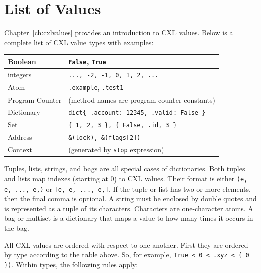 \documentclass{report}
\begin{document}



\appendix

\chapter{List of Values}

Chapter~\ref{ch:cxlvalues} provides an introduction to CXL values.
Below is a complete list of CXL value types with examples:

\vspace{1em}
\begin{tabular}{|l|l|}
\hline
Boolean & \texttt{False}, \texttt{True} \\
\hline
integers & \texttt{..., -2, -1, 0, 1, 2, ...} \\
\hline
Atom & \texttt{.example}, \texttt{.test1} \\
\hline
Program Counter & (method names are program counter constants) \\
\hline
Dictionary & \texttt{dict\{ .account: 12345, .valid: False \} } \\
\hline
Set & \texttt{\{ 1, 2, 3 \}, \{ False, .id, 3 \} } \\
\hline
Address & \texttt{\&(lock), \&(flags[2])} \\
\hline
Context & (generated by \texttt{stop} expression) \\
\hline
\end{tabular}
\vspace{1em}

Tuples, lists, strings, and bags are all special cases of dictionaries.
Both tuples and lists map indexes (starting at 0) to CXL values.
Their format is either \texttt{(e, e, ..., e,)} or
\texttt{[e, e, ..., e,]}.
If the tuple or list has two or more elements, then the final comma
is optional.
A string must be enclosed by double quotes and is represented as
a tuple of its characters.  Characters are one-character atoms.
A bag or multiset is a dictionary that maps a value to how many
times it occurs in the bag.

All CXL values are ordered with respect to one another.  First they
are ordered by type according to the table above.
So, for example, \texttt{\texttt{True} < 0 < .xyz < \{ 0 \})}.
Within types, the following rules apply:
\end{document}

